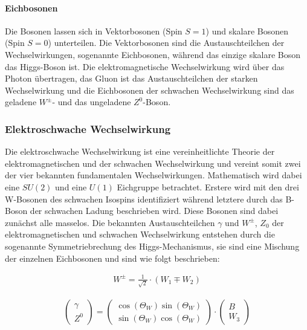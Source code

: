 \paragraph{Eichbosonen}
Die Bosonen lassen sich in Vektorbosonen (Spin $S=1$) und skalare Bosonen (Spin $S=0$) unterteilen. Die Vektorbosonen sind die Austauschteilchen der Wechselwirkungen, sogenannte Eichbosonen, während das einzige skalare Boson das Higgs-Boson ist. Die elektromagnetische Wechselwirkung wird über das Photon übertragen, das Gluon ist das Austauschteilchen der starken Wechselwirkung und die Eichbosonen der schwachen Wechselwirkung sind das geladene $W^\pm$- und das ungeladene $Z^0$-Boson.

\subsubsection{Elektroschwache Wechselwirkung}

Die elektroschwache Wechselwirkung ist eine vereinheitlichte Theorie der elektromagnetischen und der schwachen Wechselwirkung und vereint somit zwei der vier bekannten fundamentalen Wechselwirkungen. Mathematisch wird dabei eine $SU(2)$ und eine $U(1)$ Eichgruppe betrachtet. Erstere wird mit den drei W-Bosonen des schwachen Isospins identifiziert während letztere durch das B-Boson der schwachen Ladung beschrieben wird. Diese Bosonen sind dabei zunächst alle masselos. Die bekannten Austauschteilchen $\gamma$ und $W^{\pm}$, $Z_0$ der elektromagnetischen und schwachen Wechselwirkung entstehen durch die sogenannte Symmetriebrechung des Higgs-Mechanismus, sie sind eine Mischung der einzelnen Eichbosonen und sind wie folgt beschrieben:

\begin{align}
W^{\pm}=\frac{1}{\sqrt{2}}\cdot(W_1 \mp W_2)
\end{align}

\begin{align}
\begin{pmatrix}\gamma\\Z^{0}\end{pmatrix}=\begin{pmatrix}\cos(\Theta_W) \sin(\Theta_W)\\\sin(\Theta_W) \cos(\Theta_W)\end{pmatrix} \cdot \begin{pmatrix}B\\W_3\end{pmatrix}
\end{align}

